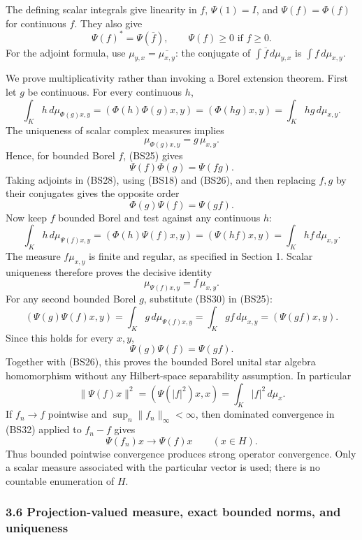 \documentclass[
  11pt,
]{article}
\begin{document}
The defining scalar integrals give linearity in \(f\), \(\Psi(1)=I\),
and \(\Psi(f)=\Phi(f)\) for continuous \(f\). They also give \[
 \Psi(f)^*=\Psi(\overline f),\qquad
 \Psi(f)\geq0\text{ if }f\geq0.
 \tag{BS26}
\] For the adjoint formula, use \(\mu_{y,x}=\overline{\mu_{x,y}}\): the
conjugate of \(\int\overline f\,d\mu_{y,x}\) is \(\int f\,d\mu_{x,y}\).

We prove multiplicativity rather than invoking a Borel extension
theorem. First let \(g\) be continuous. For every continuous \(h\), \[
 \int_Kh\,d\mu_{\Phi(g)x,y}
 =(\Phi(h)\Phi(g)x,y)
 =(\Phi(hg)x,y)=\int_Khg\,d\mu_{x,y}.
\] The uniqueness of scalar complex measures implies \[
 \mu_{\Phi(g)x,y}=g\,\mu_{x,y}.
 \tag{BS27}
\] Hence, for bounded Borel \(f\), (BS25) gives \[
 \Psi(f)\Phi(g)=\Psi(fg).
 \tag{BS28}
\] Taking adjoints in (BS28), using (BS18) and (BS26), and then
replacing \(f,g\) by their conjugates gives the opposite order \[
 \Phi(g)\Psi(f)=\Psi(gf).
 \tag{BS29}
\] Now keep \(f\) bounded Borel and test against any continuous \(h\):
\[
 \int_Kh\,d\mu_{\Psi(f)x,y}
 =(\Phi(h)\Psi(f)x,y)
 =(\Psi(hf)x,y)
 =\int_Khf\,d\mu_{x,y}.
\] The measure \(f\mu_{x,y}\) is finite and regular, as specified in
Section 1. Scalar uniqueness therefore proves the decisive identity \[
 \mu_{\Psi(f)x,y}=f\,\mu_{x,y}.
 \tag{BS30}
\] For any second bounded Borel \(g\), substitute (BS30) in (BS25): \[
 (\Psi(g)\Psi(f)x,y)
 =\int_Kg\,d\mu_{\Psi(f)x,y}
 =\int_Kgf\,d\mu_{x,y}
 =(\Psi(gf)x,y).
\] Since this holds for every \(x,y\), \[
 \Psi(g)\Psi(f)=\Psi(gf).
 \tag{BS31}
\] Together with (BS26), this proves the bounded Borel unital star
algebra homomorphism without any Hilbert-space separability assumption.
In particular \[
 \|\Psi(f)x\|^2=(\Psi(|f|^2)x,x)
                  =\int_K|f|^2\,d\mu_x.
 \tag{BS32}
\] If \(f_n\to f\) pointwise and \(\sup_n\|f_n\|_\infty<\infty\), then
dominated convergence in (BS32) applied to \(f_n-f\) gives \[
 \Psi(f_n)x\longrightarrow\Psi(f)x\qquad(x\in H).
 \tag{BS33}
\] Thus bounded pointwise convergence produces strong operator
convergence. Only a scalar measure associated with the particular vector
is used; there is no countable enumeration of \(H\).

\subsubsection{3.6 Projection-valued measure, exact bounded norms, and
uniqueness}\label{projection-valued-measure-exact-bounded-norms-and-uniqueness}
\end{document}
